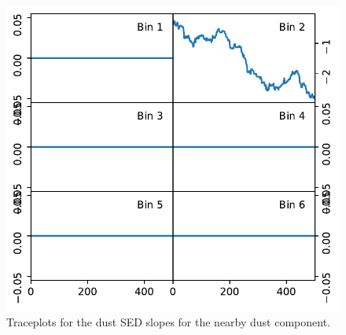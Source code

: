 \documentclass{aa}
\begin{document}
\begin{figure}
    \centering
    \includegraphics[width=\columnwidth]{"figures/traceplots_dust_sed_slopes_nearby_dust.pdf"}
    \caption{Traceplots for the dust SED slopes for the nearby dust component.}
    \label{fig:traceplots_dust_sed_slopes_nearbydust}
\end{figure}
\end{document}
